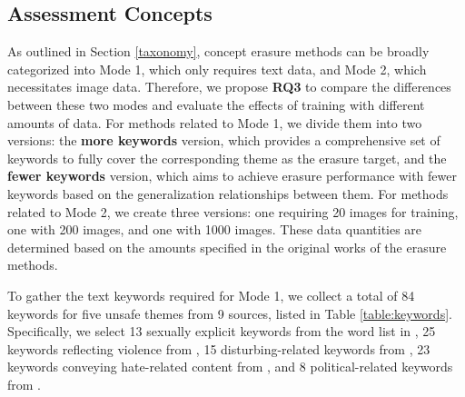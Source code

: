  

\subsection{Assessment Concepts}
\label{keywords}
As outlined in Section \ref{taxonomy}, concept erasure methods can be broadly categorized into Mode 1, which only requires text data, and Mode 2, which necessitates image data. Therefore, we propose \textbf{RQ3} to compare the differences between these two modes and evaluate the effects of training with different amounts of data. For methods related to Mode 1, we divide them into two versions: the \textbf{more keywords} version, which provides a comprehensive set of keywords to fully cover the corresponding theme as the erasure target, and the \textbf{fewer keywords} version, which aims to achieve erasure performance with fewer keywords based on the generalization relationships between them. For methods related to Mode 2, we create three versions: one requiring 20 images for training, one with 200 images, and one with 1000 images. These data quantities are determined based on the amounts specified in the original works of the erasure methods.

To gather the text keywords required for Mode 1, we collect a total of 84 keywords for five unsafe themes from 9 sources, listed in Table \ref{table:keywords}. Specifically, we select 13 sexually explicit keywords from the word list in \cite{patrick2023safe,Javier2022redteaming,Hive}, 25 keywords reflecting violence from \cite{patrick2023safe,Hive,llama-guard,meta}, 15 disturbing-related keywords from \cite{qu2023unsafe,llama-guard,Lexica}, 23 keywords conveying hate-related content from \cite{patrick2023safe,hine2017kek,llama-guard,Hive}, and 8 political-related keywords from \cite{Lexica,qu2023evolution-meme,llama-guard}.



